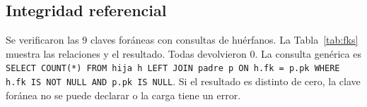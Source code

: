\begin{table}[H]
  \centering
  \caption{Comparativa de conteos origen vs. destino}
  \label{tab:comparativa-conteos}
\end{table}

\subsection{Integridad referencial}

Se verificaron las 9 claves foráneas con consultas de huérfanos. La
Tabla~\ref{tab:fks} muestra las relaciones y el resultado. Todas devolvieron
0. La consulta genérica es \texttt{SELECT COUNT(*) FROM hija h LEFT JOIN padre
p ON h.fk = p.pk WHERE h.fk IS NOT NULL AND p.pk IS NULL}. Si el resultado es
distinto de cero, la clave foránea no se puede declarar o la carga tiene un
error.

